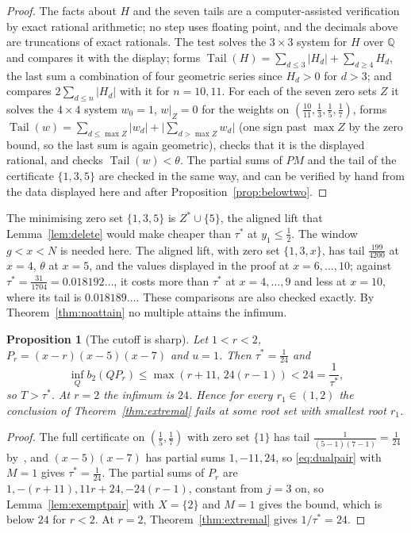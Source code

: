 \documentclass[11pt]{article}
\newtheorem{proposition}[theorem]{Proposition}
\theoremstyle{definition}
\theoremstyle{plain}
\DeclareMathOperator{\Tail}{Tail}
\begin{document}
\begin{proof}
The facts about $H$ and the seven tails are a computer-assisted
verification by exact rational arithmetic; no step uses floating point, and the
decimals above are truncations of exact rationals.  The test solves the
$3\times3$ system for $H$ over $\mathbb Q$ and compares it with the display;
forms $\Tail(H)=\sum_{d\le3}|H_d|+\sum_{d\ge4}H_d$, the last sum a
combination of four geometric series since $H_d>0$ for $d>3$; and compares
$2\sum_{d\le n}|H_d|$ with it for $n=10,11$.  For each of the seven zero
sets $Z$ it solves the $4\times4$ system $w_0=1$, $w|_Z=0$ for the weights
on $(\tfrac{10}{11},\tfrac13,\tfrac15,\tfrac17)$, forms
$\Tail(w)=\sum_{d\le\max Z}|w_d|+\bigl|\sum_{d>\max Z}w_d\bigr|$ (one sign
past $\max Z$ by the zero bound, so the last sum is again geometric),
checks that it is the displayed rational, and checks $\Tail(w)<\theta$.  The partial sums of $PM$ and the tail of
the certificate $\{1,3,5\}$ are checked in the same way, and can be
verified by hand from the data displayed here and after
Proposition~\ref{prop:belowtwo}.
\end{proof}

The minimising zero set $\{1,3,5\}$ is $Z^*\cup\{5\}$, the aligned lift that
Lemma~\ref{lem:delete} would make cheaper than $\tau^*$ at $y_1\le\tfrac12$.
The window $g<x<N$ is needed here.  The aligned lift, with zero set
$\{1,3,x\}$, has tail $\tfrac{199}{4200}$ at $x=4$, $\theta$ at $x=5$, and
the values displayed in the proof at $x=6,\ldots,10$; against
$\tau^*=\tfrac{31}{1704}=0.018192\ldots$, it costs more than $\tau^*$ at
$x=4,\ldots,9$ and less at $x=10$, where its tail is $0.018189\ldots$.
These comparisons are also checked exactly.  By Theorem~\ref{thm:noattain} no
multiple attains the infimum.

\begin{proposition}[The cutoff is sharp]\label{prop:cutoffsharp}
Let $1<r<2$, $P_r=(x-r)(x-5)(x-7)$ and $u=1$.  Then $\tau^*=\tfrac1{24}$
and
\[
  \inf_Qb_2(QP_r)\le\max(r+11,\,24(r-1))<24=\frac1{\tau^*},
\]
so $T>\tau^*$.  At $r=2$ the infimum is $24$.  Hence for every
$r_1\in(1,2)$ the conclusion of Theorem~\ref{thm:extremal} fails at some
root set with smallest root $r_1$.
\end{proposition}

\begin{proof}
The full certificate on $(\tfrac15,\tfrac17)$ with zero set $\{1\}$ has
tail $\tfrac1{(5-1)(7-1)}=\tfrac1{24}$ by~\cite[Lemma~2.1]{coefficient-mass}, and $(x-5)(x-7)$ has
partial sums $1,-11,24$, so \eqref{eq:dualpair} with $M=1$ gives
$\tau^*=\tfrac1{24}$.  The partial sums of $P_r$ are
$1,-(r+11),11r+24,-24(r-1)$, constant from $j=3$ on, so
Lemma~\ref{lem:exemptpair} with $X=\{2\}$ and $M=1$ gives the bound, which
is below $24$ for $r<2$.  At $r=2$, Theorem~\ref{thm:extremal} gives
$1/\tau^*=24$.
\end{proof}
\end{document}
